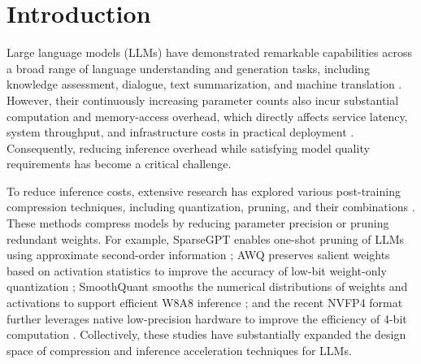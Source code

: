 \documentclass[letterpaper]{article} %
\begin{document}
\begin{abstract}
\end{abstract}




\section{Introduction}
Large language models (LLMs) have demonstrated remarkable capabilities across a broad range of language understanding and generation tasks, including knowledge assessment, dialogue, text summarization, and machine translation \cite{touvron2023llama2,grattafiori2024llama3}. However, their continuously increasing parameter counts also incur substantial computation and memory-access overhead, which directly affects service latency, system throughput, and infrastructure costs in practical deployment \cite{kwon2023vllm}. Consequently, reducing inference overhead while satisfying model quality requirements has become a critical challenge.

To reduce inference costs, extensive research has explored various post-training compression techniques, including quantization, pruning, and their combinations \cite{xiao2023smoothquant,frantar2023gptq,lin2024awq,frantar2023sparsegpt,sun2024wanda}. These methods compress models by reducing parameter precision or pruning redundant weights. For example, SparseGPT enables one-shot pruning of LLMs using approximate second-order information \cite{frantar2023sparsegpt}; AWQ preserves salient weights based on activation statistics to improve the accuracy of low-bit weight-only quantization \cite{lin2024awq}; SmoothQuant smooths the numerical distributions of weights and activations to support efficient W8A8 inference \cite{xiao2023smoothquant}; and the recent NVFP4 format further leverages native low-precision hardware to improve the efficiency of 4-bit computation \cite{alvarez2025nvfp4}. Collectively, these studies have substantially expanded the design space of compression and inference acceleration techniques for LLMs.
\end{document}
